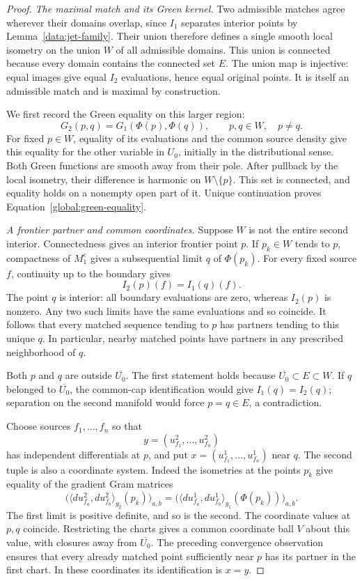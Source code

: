 \begin{proof}
\emph{The maximal match and its Green kernel.}\quad
Two admissible matches agree wherever their domains overlap, since
$I_1$ separates interior points by Lemma~\ref{data:jet-family}.
Their union therefore defines a single smooth local isometry on
the union $W$ of all admissible domains. This union is connected
because every domain contains the connected set $E$. The union
map is injective: equal images give equal $I_2$ evaluations, hence
equal original points. It is itself an admissible match and is
maximal by construction.

We first record the Green equality on this larger region:
\begin{equation}\label{global:green-equality}
 G_2(p,q)=G_1(\Phi(p),\Phi(q)),
             \qquad p,q\in W,\quad p\ne q.
\end{equation}
For fixed $p\in W$, equality of its evaluations and the common
source density give this equality for the other variable in $U_0$,
initially in the distributional sense. Both Green functions are
smooth away from their pole. After pullback by the local isometry,
their difference is harmonic on $W\setminus\{p\}$. This set is
connected, and equality holds on a nonempty open part of it.
Unique continuation proves Equation~\eqref{global:green-equality}.

\emph{A frontier partner and common coordinates.}\quad
Suppose $W$ is not the entire second interior. Connectedness gives
an interior frontier point $p$. If $p_k\in W$ tends to $p$,
compactness of $M_1^e$ gives a subsequential limit $q$ of
$\Phi(p_k)$. For every fixed source $f$, continuity up to the
boundary gives
\[
 I_2(p)(f)=I_1(q)(f).
\]
The point $q$ is interior: all boundary evaluations are zero,
whereas $I_2(p)$ is nonzero. Any two such limits have the same
evaluations and so coincide. It follows that every matched sequence
tending to $p$ has partners tending to this unique $q$.
In particular, nearby matched points have partners in any prescribed
neighborhood of $q$.

Both $p$ and $q$ are outside $\overline{U_0}$. The first statement
holds because $\overline{U_0}\subset E\subset W$. If $q$ belonged
to $\overline{U_0}$, the common-cap identification would give
$I_1(q)=I_2(q)$; separation on the second manifold would force
$p=q\in E$, a contradiction.

Choose sources $f_1,\ldots,f_n$ so that
\[
 y=(u_{f_1}^2,\ldots,u_{f_n}^2)
\]
has independent differentials at $p$, and put
$x=(u_{f_1}^1,\ldots,u_{f_n}^1)$ near $q$.
The second tuple is also a coordinate system. Indeed the isometries
at the points $p_k$ give equality of the gradient Gram matrices
\[
 \bigl(\langle du_{f_a}^2,du_{f_b}^2\rangle_{g_2}(p_k)\bigr)_{a,b}
 =
 \bigl(\langle du_{f_a}^1,du_{f_b}^1\rangle_{g_1}(\Phi(p_k))\bigr)_{a,b}.
\]
The first limit is positive definite, and so is the second.
The coordinate values at $p,q$ coincide. Restricting the charts
gives a common coordinate ball $V$ about this value, with closures
away from $\overline{U_0}$. The preceding convergence observation
ensures that every already matched point sufficiently near $p$
has its partner in the first chart. In these coordinates its
identification is $x=y$.


\end{proof}
